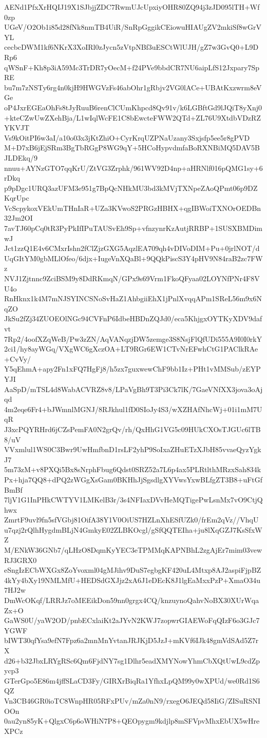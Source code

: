 AENd1PfxXrHQIJ19X1SJbjjZDC7RwmUJcUpxiyOHR80ZQ94j3zJD095lTH+Wf0zp
UGeV/O2Ob1i85d28fNk8nmTB4UiR/SnRpGggikCEiowuHIAUgZV2mkiSf8wGrVYL
cecbcDWM1kf6NKrX3XoIRl0zJycn5zVtpNBf3uESCtWlUJH/gZ7w3GvQ0+L9DRp6
qWSnF+Kh8p3iA59Mc3TrDR7yOecM+f24PVe9bbdCR7NU6aipLfS12Jxpary7SpRE
bu7m7zNSTy6rg4n0kjH9HWGVzFs46abOhr1gRbjv2VG0lACe+UBAtKxzwrm8eVGe
oP4JxrEGEaOhFs8tJyRuuB6renClCUmKhpcd8Qv91v/k6LGBftGd9lJQiT8yXnj0
+kteCZwUwZXehBja/L1wIqlWcFE1C8bEwcteFWW2QTd+ZL76U9XtdbVDzRZYKVJT
Vs9kOitPI6w3aI/a10o03x3jKtZhiO+CyrKrqUZPNaUzany3Sxjsfp5ee5r8gPVD
M+D7xB6jEjSRm3BgTbRGgP8WG9qY+5HCoHypvdmfaBoRXNBiMQ5DAV5BJLDEkq/9
nnuu+AYNzGTO7qqKrU/ZtVG3Zrphk/961WV92D4np+aHRNlf016pQMG1sy+6rDkq
p9pDgc1URQ3azUFM3e951g7BpQcNHkMU3bd3kMVjTXNpeZAoQPmt06p9DZKqrUpc
VcScpykoxVEkUmTHnIaR+UZa3KVwoS2PRGzHBHX+qgIBWoiTXNOrOEDBn32Jm2OI
7avTJ60pCq0tR3PyPkIfIPuTAUSvEh9Sp+vfnzynrKzAutjRRBP+1SUSXBMDimwJ
Jct1zzQ1E4v6CMxrIshn2fClZjzGXG5AqzlEA709qh4vDIVoDIM+Pu+0jrlNOT/d
UqGItYM0gbMLlOfeo/6djx+IugeVnXQaBl+9QQkPiscS3Y4pHV9N84raB2zc7FWz
NVJ1Zjtnnc9ZciBSM9y8DdRKmqN/GPx9s69Vrm1FkoQFyaa02LOYNfPNr4F8VU4o
RnHknx1k4M7mNJSYINCSNoSvHaZ1AhbgiiEhX1jPnlXvqqAPm1SReL56m9x6NqZO
JkSu2fZj34ZUOEOlNGc94CVFnP6IdbeHBDnZQJd0/eca5KhjgxOYTKyXDV9dafvt
7Rp2/4oofXZqWeB/Pw3zZN/AqVANqzjDW5zemge3S8NsjFlQfUDi555A9I0I0rkY
2ci1/hy8ayWGq/VXgWC6gXczOA+LT9RGr6EW1CTvNrEFwhCtG1PAClkRAe+CvVy/
Y5qEhmA+apy2Fn1xFQ7HgFj8/h5zx7guxwewChF9bb1Iz+PHt1vMMSub/zEYPYJI
AaSpD/mTSL4d8WabACVRZ8v8/LPaVgBh9T3Pi3Ck7lK/7GaeVNfXX3jova3oAjqd
4m2eqe6Fr4+bJWmnlMGNJ/8RJkhul1fD0SIoJy4S3/wXZHAfNhcWj+01i1mM7UqR
J3xcPQYRHrd6jCZsPemFA0N2grQv/rh/QxHhG1VG5c09HUkCXOsTJGUc6lTB8/uV
VVxmlul1WS0C3Bwr9UwHmfbnD1rsLF2yhP9SoIxaZHuETzXJbH85vvaeQyzYgkJ7
5m73zM+v8PXQi5Bx8sNrphFbug6Qdst0SRZ52a7L6p4ax5PLRtlthMRzxSah834k
Px+hja7QQ8+dPQ2zWGgXsGam0BKHhJjSgsdlgXYVwsYxwBLfgZT3B8+uFtGfBmBf
7ljV1G1InPHkCWTYV1LMKelB3r/3s4NFIaxDVvHeMQTigePwLsnMx7vO9CtjQhwx
ZmrtF9uvl9fn5sfVGbj81OifA38Y1V0OiUS7HZLnXhESfUZk0/frEm2qVz//VhqU
u7qzj2rQlhHygdmBLjN4GmkyE02ZLBKOcgl/gSfQQTEIha+ju8lXqGZJ7KsSfxWZ
M/ENkW36GNb7/qLHzO8DqmKyYEC3eTPMMqKAPNBhL2zgAjEr7mim03vewRJ3GRX0
eSngIzECbWXGx8ZoYvoxml04gMJihv9DuS7egbgKF420uL4Mtxp8AJ2aspiFjpBZ
4kYy4bXy19NMLMfU+HEDSdGXJjz2xA6J1eDEcK8J1lgEaMxxPzP+XmaO34u7HJ2w
DmWcOKqf/LRRJz7oMEEikDon59nn0grgx4CQ/knzuynoQahvNoBX30XUrWqaZx+O
GaWS0U/yaW2OD/pnbECxlaiKt2aJYvN2KWJ7zopwrGIAEWoFqQIzF6o3GJc7YGWF
bIWT30qfYsa9efN7Fpz6a2mnMnYvtanJRJKjD5JzJ+mKVf6IJk48gmVdSAd5Z7rX
d26+b32JbxLRYgRSc6Qm6FjdNY7sg1Dlhr5eadXMYNowYhmCbXQtUwL9cdZpycp3
GTerGpo5E86m4jffSLaCD3Fy/GIRXrBiqRa1YfhxLpQM99y0wXPUd/we0Rd1S6QZ
Vn3CB46GR0ioTC8WnpHR05RFxPUv/mZa0nN9/rxegO6JEQd58IiG/ZISuRSNIOOn
0au2yn85yK+QlgxC6p6oWHiN7P8+QEOpygm9kdjlp8mSFVpvMhxEbUX5wHreXPCz
